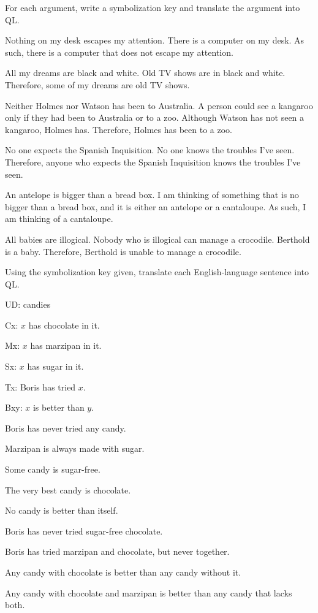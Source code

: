\problempart
\label{pr.QLarguments}
For each argument, write a symbolization key and translate the argument into QL.
\begin{earg}
\item Nothing on my desk escapes my attention. There is a computer on my desk. As such, there is a computer that does not escape my attention.
\item All my dreams are black and white. Old TV shows are in black and white. Therefore, some of my dreams are old TV shows.
\item Neither Holmes nor Watson has been to Australia. A person could see a kangaroo only if they had been to Australia or to a zoo. Although Watson has not seen a kangaroo, Holmes has. Therefore, Holmes has been to a zoo.
\item No one expects the Spanish Inquisition. No one knows the troubles I've seen. Therefore, anyone who expects the Spanish Inquisition knows the troubles I've seen.
\item An antelope is bigger than a bread box. I am thinking of something that is no bigger than a bread box, and it is either an antelope or a cantaloupe. As such, I am thinking of a cantaloupe.
\item All babies are illogical. Nobody who is illogical can manage a crocodile. Berthold is a baby. Therefore, Berthold is unable to manage a crocodile.
\end{earg}

\solutions
\problempart
\label{pr.QLcandies}
Using the symbolization key given, translate each English-language sentence into QL.
\begin{ekey}
\item[UD:] candies
\item[Cx:] $x$ has chocolate in it.
\item[Mx:] $x$ has marzipan in it.
\item[Sx:] $x$ has sugar in it.
\item[Tx:] Boris has tried $x$.
\item[Bxy:] $x$ is better than $y$.
\end{ekey}
\begin{earg}
\item Boris has never tried any candy.
\item Marzipan is always made with sugar.
\item Some candy is sugar-free.
\item The very best candy is chocolate.
\item No candy is better than itself.
\item Boris has never tried sugar-free chocolate.
\item Boris has tried marzipan and chocolate, but never together.
\item Any candy with chocolate is better than any candy without it.
\item Any candy with chocolate and marzipan is better than any candy that lacks both.
\end{earg}


